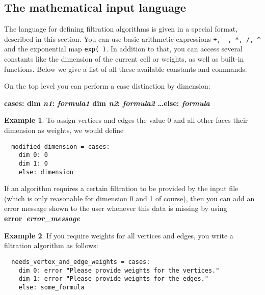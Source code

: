 \documentclass{amsart}
\theoremstyle{definition}
\newtheorem*{example*}{Example}
\begin{document}
\subsection{The mathematical input language}
The language for defining filtration algorithms is given in a special format, described in this
section.
You can use basic arithmetic expressions \verb|+, -, *, /, ^| and the exponential map \verb|exp( )|.
In addition to that, you can access several constants like the dimension of the current cell or
weights, as well as built-in functions.
Below we give a list of all these available constants and commands.

\vspace{1em}

On the top level you can perform a case distinction by dimension:

\noindent
\textbf{cases: dim \textit{n1}: \textit{formula1} dim \textit{n2}: \textit{formula2} \ldots else:
\textit{formula}}
\begin{example*}
  To assign vertices and edges the value 0 and all other faces their dimension as weights,
  we would define
  \begin{verbatim}
  modified_dimension = cases:
    dim 0: 0
    dim 1: 0
    else: dimension
  \end{verbatim}
\end{example*}
If an algorithm requires a certain filtration to be provided by the input file (which is only
reasonable for dimension 0 and 1 of course), then you can add an error message shown to the user
whenever this data is missing by using \textbf{error~\textit{error\_message}}
\begin{example*}
  If you require weights for all vertices and edges, you write a filtration algorithm as
  follows:
  \begin{verbatim}
  needs_vertex_and_edge_weights = cases:
    dim 0: error "Please provide weights for the vertices."
    dim 1: error "Please provide weights for the edges."
    else: some_formula
  \end{verbatim}
\end{example*}
\end{document}
